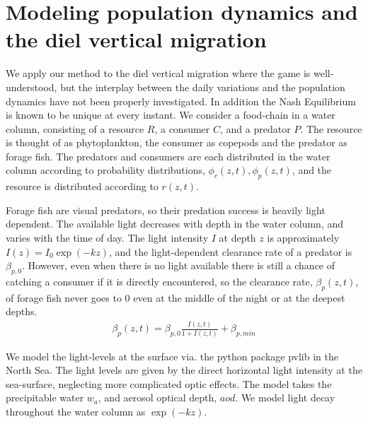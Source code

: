 
\section{Modeling population dynamics and the diel vertical migration}
We apply our method to the diel vertical migration where the game is well-understood, but the interplay between the daily variations and the population dynamics have not been properly investigated. In addition  the Nash Equilibrium is known to be unique \citep{verticalmigration} at every instant.
We consider a food-chain in a water column, consisting of a resource $R$, a consumer $C$, and a predator $P$. The resource is thought of as phytoplankton, the consumer as copepods and the predator as forage fish. The predators and consumers are each distributed in the water column according to probability distributions, $\phi_c(z,t),\phi_p(z,t)$, and the resource is distributed according to $r(z,t)$.


Forage fish are visual predators, so their predation success is heavily light dependent. The available light decreases with depth in the water column, and varies with the time of day.
The light intensity $I$ at depth $z$ is approximately $I(z) = I_0\exp(-kz)$, and the light-dependent clearance rate of a predator is $\beta_{p,0}$.  However, even when there is no light available there is still a chance of catching a consumer if it is directly encountered,  so the clearance rate, $\beta_p(z,t)$, of forage fish never goes to 0 even at the middle of the night or at the deepest depths.
\begin{align*}
  \beta_p(z,t) = \beta_{p,0} \frac{I(z,t)}{1+I(z,t)} + \beta_{p,min}
\end{align*}


We model the light-levels at the surface via. the python package pvlib \citep{holmgren2018pvlib} in the North Sea. The light levels are given by the direct horizontal light intensity at the sea-surface, neglecting more complicated optic effects. The model takes the precipitable water $w_a$, and aerosol optical depth, $aod$. We model light decay throughout the water column as $\exp(-kz)$.


